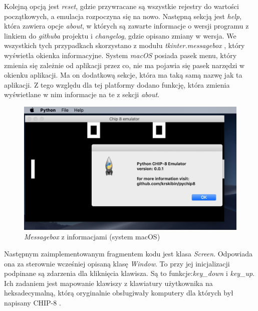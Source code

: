 \newpage

Kolejną opcją jest \textit{reset}, gdzie przywracane są wszystkie rejestry do wartości początkowych, a emulacja rozpoczyna się na nowo. Następną sekcją jest \textit{help}, która zawiera opcje \textit{about}, w których są zawarte informacje o wersji programu z linkiem do \textit{githuba} projektu i \textit{changelog}, gdzie opisano zmiany w wersja. We wszystkich tych przypadkach skorzystano z modułu \textit{tkinter.messagebox} \cite{TKINTER}, który wyświetla okienka informacyjne. System \textit{macOS} posiada pasek menu, który zmienia się zależnie od aplikacji przez co, nie ma pojawia się pasek narzędzi w okienku aplikacji. Ma on dodatkową sekcje, która ma taką samą nazwę jak ta aplikacji. Z tego względu dla tej platformy dodano funkcję, która zmienia wyświetlane w nim informacje na te z sekcji \textit{about}.


\begin{figure}[!htb]
\begin{center}
	\includegraphics[scale=0.4]{images/aboutSection}
	\caption{\textit{Messagebox} z informacjami (system macOS)}
\end{center}
\end{figure}

Następnym zaimplementowanym fragmentem kodu jest klasa \textit{Screen}. Odpowiada ona za sterownie wcześniej opisaną klasę \textit{Window}. To przy jej inicjalizacji podpinane są zdarzenia dla kliknięcia klawisza. Są to funkcje:\textit{key\_down} i \textit{key\_up}. Ich zadaniem jest mapowanie klawiszy z klawiatury użytkownika na heksadecymalną, którą oryginalnie obsługiwały komputery dla których był napisany CHIP-8 \cite{COSMAC}.

